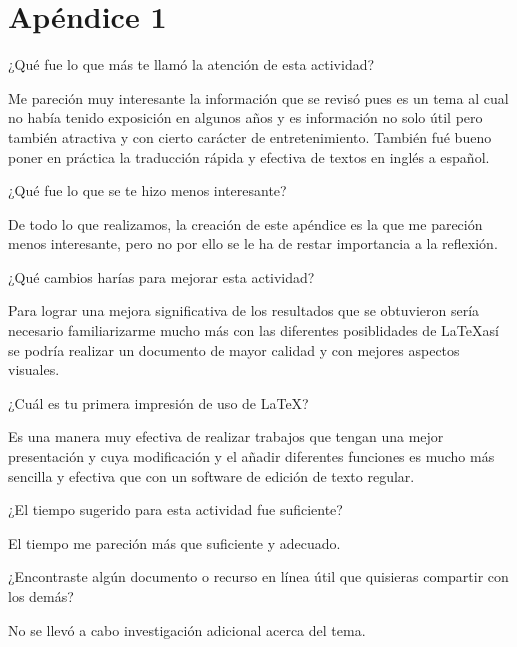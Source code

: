 \documentclass{article} %
\begin{document}
\vspace{0.5cm}


\section*{Apéndice 1}

\hspace{0.45 cm} ¿Qué fue lo que más te llamó la atención de esta actividad?

\vspace{0.5 cm}
Me pareción muy interesante la información que se revisó pues es un tema al cual no había tenido exposición en algunos años y es información no solo útil pero también atractiva y con cierto carácter de entretenimiento. También fué bueno poner en práctica la traducción rápida y efectiva de textos en inglés a español. 
\vspace{0.5 cm}

¿Qué fue lo que se te hizo menos interesante?

\vspace{0.5 cm}
De todo lo que realizamos, la creación de este apéndice es la que me pareción menos interesante, pero no por ello se le ha de restar importancia a la reflexión.
\vspace{0.5 cm}

¿Qué cambios harías para mejorar esta actividad? 

\vspace{0.5 cm}
Para lograr una mejora significativa de los resultados que se obtuvieron sería necesario familiarizarme mucho más con las diferentes posiblidades de \LaTeX así se podría realizar un documento de mayor calidad y con mejores aspectos visuales. 
\vspace{0.5 cm}

¿Cuál es tu primera impresión de uso de \LaTeX?

\vspace{0.5 cm}
Es una manera muy efectiva de realizar trabajos que tengan una mejor presentación y cuya modificación y el añadir diferentes funciones es mucho más sencilla y efectiva que con un software de edición de texto regular.  
\vspace{0.5 cm}

¿El tiempo sugerido para esta actividad fue suficiente? 

\vspace{0.5 cm}
El tiempo me pareción más que suficiente y adecuado.
\vspace{0.5 cm}

¿Encontraste algún documento o recurso en línea útil que quisieras compartir con los demás?  

\vspace{0.5 cm}
No se llevó a cabo investigación adicional acerca del tema.
\vspace{0.5 cm}

 
 
 
\end{document}
